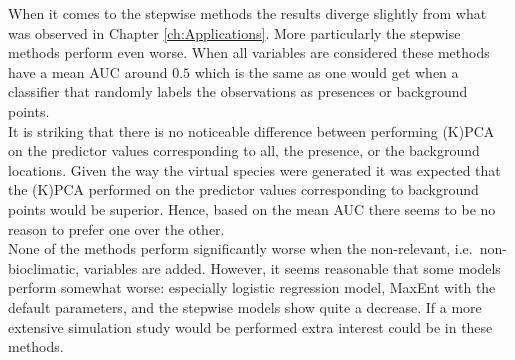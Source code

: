 When it comes to the stepwise methods the results diverge slightly from what was observed in Chapter \ref{ch:Applications}. More particularly the stepwise methods perform even worse. When all variables are considered these methods have a mean AUC around $0.5$ which is the same as one would get when a classifier that randomly labels the observations as presences or background points. \\

It is striking that there is no noticeable difference between performing (K)PCA on the predictor values corresponding to all, the presence, or the background locations. Given the way the virtual species were generated it was expected that the (K)PCA performed on the predictor values corresponding to background points would be superior. Hence, based on the mean AUC there seems to be no reason to prefer one over the other. \\

None of the methods perform significantly worse when the non-relevant, i.e.\ non-bioclimatic, variables are added. However, it seems reasonable that some models perform somewhat worse: especially logistic regression model, MaxEnt with the default parameters, and the stepwise models show quite a decrease. If a more extensive simulation study would be performed extra interest could be in these methods. \\

